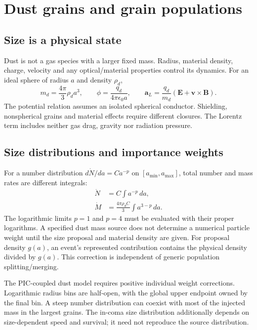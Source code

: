 \chapter{Dust grains and grain populations}\label{ch:dust}
\section{Size is a physical state}
Dust is not a gas species with a larger fixed mass. Radius, material density,
charge, velocity and any optical/material properties control its dynamics.
For an ideal sphere of radius $a$ and density $\rho_d$,
\begin{equation}
m_d=\frac{4\pi}{3}\rho_da^3,\qquad
\phi=\frac{q_d}{4\pi\epsilon_0a},\qquad
\boldsymbol a_L=\frac{q_d}{m_d}
(\boldsymbol E+\boldsymbol v\times\boldsymbol B).
\end{equation}
The potential relation assumes an isolated spherical conductor. Shielding,
nonspherical grains and material effects require different closures.
The Lorentz term includes neither gas drag, gravity nor radiation pressure.

\section{Size distributions and importance weights}
For a number distribution $d\dot N/da=Ca^{-p}$ on
$[a_{\min},a_{\max}]$, total number and mass rates are different integrals:
\begin{align}
\dot N&=C\int a^{-p}\,da,\\
\dot M&=\frac{4\pi\rho_dC}{3}\int a^{3-p}\,da .
\end{align}
The logarithmic limits $p=1$ and $p=4$ must be evaluated with their proper
logarithms. A specified dust mass source does not determine a numerical
particle weight until the size proposal and material density are given.
For proposal density $g(a)$, an event's represented contribution contains
the physical density divided by $g(a)$. This correction is independent of
generic population splitting/merging.

The PIC-coupled dust model requires positive individual weight corrections.
Logarithmic radius bins are half-open, with the global upper endpoint owned
by the final bin. A steep number distribution can coexist with most of the
injected mass in the largest grains. The in-coma size distribution additionally
depends on size-dependent speed and survival; it need not reproduce the
source distribution.

